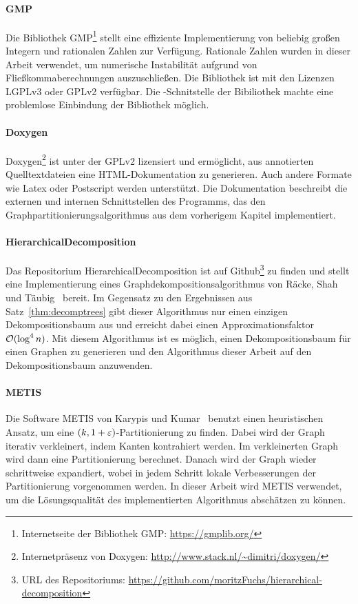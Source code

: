 \paragraph{GMP}
Die Bibliothek GMP\footnote{Internetseite der Bibliothek GMP: \url{https://gmplib.org/}} stellt eine effiziente Implementierung von beliebig großen Integern und rationalen Zahlen zur Verfügung.
Rationale Zahlen wurden in dieser Arbeit verwendet, um numerische Instabilität aufgrund von Fließkommaberechnungen auszuschließen.
Die Bibliothek ist mit den Lizenzen LGPLv3 oder GPLv2 verfügbar.
Die \Cpp\hyp Schnitstelle der Bibiliothek machte eine problemlose Einbindung der Bibliothek möglich.

\paragraph{Doxygen}
Doxygen\footnote{Internetpräsenz von Doxygen: \url{http://www.stack.nl/~dimitri/doxygen/}} ist unter der GPLv2 lizensiert und ermöglicht, aus annotierten Quelltextdateien eine HTML\hyp Dokumentation zu generieren.
Auch andere Formate wie Latex oder Postscript werden unterstützt.
Die Dokumentation beschreibt die externen und internen Schnittstellen des Programms, das den Graphpartitionierungsalgorithmus aus dem vorherigem Kapitel implementiert.

\paragraph{HierarchicalDecomposition}
Das Repositorium HierarchicalDecomposition ist auf Github\footnote{URL des Repositoriums: \url{https://github.com/moritzFuchs/hierarchical-decomposition}} zu finden und stellt eine Implementierung eines Graphdekompositionsalgorithmus von Räcke, Shah und Täubig~\parencite{RST14} bereit.
Im Gegensatz zu den Ergebnissen aus Satz~\ref{thm:decomptrees} gibt dieser Algorithmus nur einen einzigen Dekompositionsbaum aus und erreicht dabei einen Approximationsfaktor $\mathcal{O}(\log^4 n)$.
Mit diesem Algorithmus ist es möglich, einen Dekompositionsbaum für einen Graphen zu generieren und den Algorithmus dieser Arbeit auf den Dekompositionsbaum anzuwenden.

\paragraph{METIS}
Die Software METIS von Karypis und Kumar~\cite{KK98} benutzt einen heuristischen Ansatz, um eine $(k, 1 + \varepsilon)$\hyp Partitionierung zu finden. 
Dabei wird der Graph iterativ verkleinert, indem Kanten kontrahiert werden.
Im verkleinerten Graph wird dann eine Partitionierung berechnet.
Danach wird der Graph wieder schrittweise expandiert, wobei in jedem Schritt lokale Verbesserungen der Partitionierung vorgenommen werden.
In dieser Arbeit wird METIS verwendet, um die Lösungsqualität des implementierten Algorithmus abschätzen zu können.

